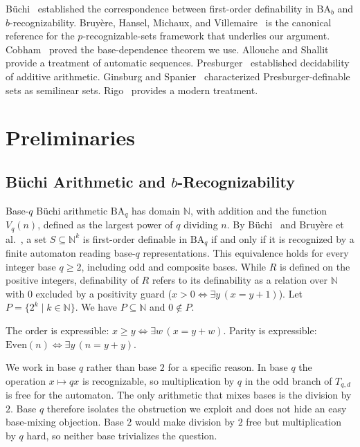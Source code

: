 \documentclass[runningheads]{llncs}
\begin{document}
B\"uchi~\cite{Buchi} established the correspondence between first-order
definability in $\mathrm{BA}_b$ and $b$-recognizability. Bruy\`ere,
Hansel, Michaux, and Villemaire~\cite{Bruyere} is the canonical
reference for the $p$-recognizable-sets framework that underlies our
argument. Cobham~\cite{Cobham} proved the base-dependence theorem we
use. Allouche and Shallit~\cite{AlloucheShallit} provide a treatment of
automatic sequences. Presburger~\cite{Presburger} established
decidability of additive arithmetic. Ginsburg and
Spanier~\cite{Ginsburg} characterized Presburger-definable sets as
semilinear sets. Rigo~\cite{Rigo} provides a modern
treatment.

\section{Preliminaries}
\label{sec:prelim}

\subsection{B\"uchi Arithmetic and $b$-Recognizability}

Base-$q$ B\"uchi arithmetic $\mathrm{BA}_q$ has domain $\mathbb{N}$,
with addition and the function $V_q(n)$, defined as the largest power of $q$
dividing $n$. By B\"uchi~\cite{Buchi} and Bruy\`ere et al.~\cite[Section~2]{Bruyere},
a set $S \subseteq \mathbb{N}^k$ is first-order definable in
$\mathrm{BA}_q$ if and only if it is recognized by a finite automaton
reading base-$q$ representations. This equivalence holds for every integer base $q \ge 2$, including odd and composite bases. While $R$ is defined on the positive integers, definability of $R$ refers to its definability as a relation over $\mathbb{N}$ with $0$ excluded by a positivity guard ($x > 0 \iff \exists y\,(x = y+1)$). Let $P = \{2^k \mid k \in \mathbb{N}\}$. We have $P \subseteq \mathbb{N}$ and $0 \notin P$.

The order is expressible: $x \ge y \iff \exists w\,(x = y+w)$.
Parity is expressible: $\mathrm{Even}(n) \iff \exists y\,(n = y+y)$.

We work in base $q$ rather than base $2$ for a specific reason. In base
$q$ the operation $x \mapsto qx$ is recognizable, so multiplication by
$q$ in the odd branch of $T_{q,d}$ is free for the automaton. The only
arithmetic that mixes bases is the division by $2$. Base $q$ therefore
isolates the obstruction we exploit and does not hide an easy
base-mixing objection. Base $2$ would make division by $2$ free but
multiplication by $q$ hard, so neither base trivializes the question.
\end{document}
